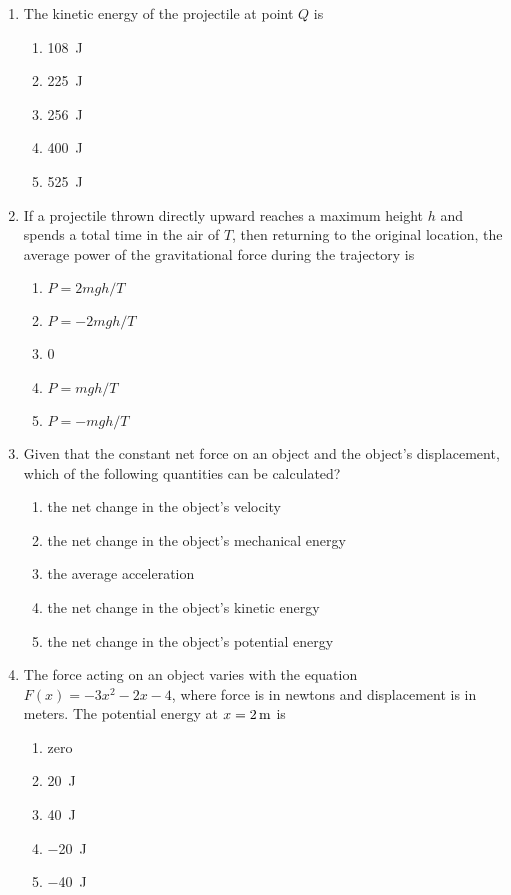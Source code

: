 \documentclass{../../../oss-apphys}
\begin{document}
\begin{multicols}{2}
\begin{enumerate}[leftmargin=18pt,resume]
  \item The kinetic energy of the projectile at point $Q$ is
    \label{q:pq2}
    \begin{enumerate}[nosep,leftmargin=18pt,label=(\Alph*)]
    \item\SI{108}{\joule}
    \item\SI{225}{\joule}
    \item\SI{256}{\joule}
    \item\SI{400}{\joule}
    \item\SI{525}{\joule}
    \end{enumerate}
    \columnbreak
    
  \item If a projectile thrown directly upward reaches a maximum height $h$ and
    spends a total time in the air of $T$, then returning to the original
    location, the average power of the gravitational force during the
    trajectory is
    \begin{enumerate}[nosep,leftmargin=18pt,label=(\Alph*)]
    \item $P=2mgh/T$
    \item $P=-2mgh/T$
    \item 0
    \item $P=mgh/T$
    \item $P=-mgh/T$
    \end{enumerate}

  \item Given that the constant net force on an object and the object's 
    displacement, which of the following quantities can be calculated?
    \begin{enumerate}[nosep,leftmargin=18pt,label=(\Alph*)]
    \item the net change in the object's velocity
    \item the net change in the object's mechanical energy
    \item the average acceleration
    \item the net change in the object's kinetic energy
    \item the net change in the object's potential energy
    \end{enumerate}
    
  \item The force acting on an object varies with the equation
    $F(x)=-3x^2-2x-4$, where force is in newtons and displacement is in meters.
    The potential energy at $x=\SI2{\metre}$ is
    \begin{enumerate}[nosep,leftmargin=18pt,label=(\Alph*)]
    \item zero
    \item\SI{20}{\joule}
    \item\SI{40}{\joule}
    \item\SI{-20}{\joule}
    \item\SI{-40}{\joule}
    \end{enumerate}
    

\end{enumerate}
\end{multicols}
\end{document}
